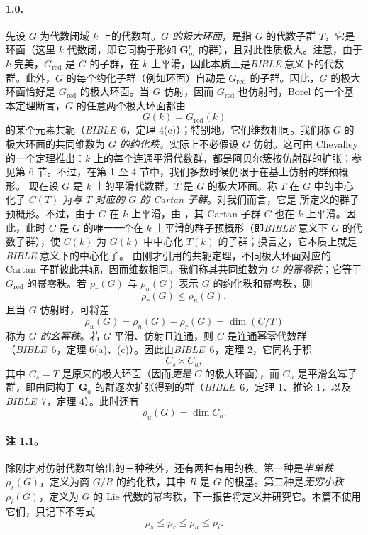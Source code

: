 \paragraph{\textbf{1.0.}}
先设 \(G\) 为代数闭域 \(k\) 上的代数群。\emph{\(G\) 的极大环面}，是指 \(G\) 的代数子群 \(T\)，它是环面（这里 \(k\) 代数闭，即它同构于形如 \(\mathbf G_m^r\) 的群），且对此性质极大。注意，由于 \(k\) 完美，\(G_{\mathrm{red}}\) 是 \(G\) 的子群，在 \(k\) 上平滑，因此本质上是\emph{BIBLE} 意义下的代数群。此外，\(G\) 的每个约化子群（例如环面）自动是 \(G_{\mathrm{red}}\) 的子群。因此，\(G\) 的极大环面恰好是 \(G_{\mathrm{red}}\) 的极大环面。当 \(G\) 仿射，因而 \(G_{\mathrm{red}}\) 也仿射时，Borel 的一个基本定理断言，\(G\) 的任意两个极大环面都由
\[
  G(k)=G_{\mathrm{red}}(k)
\]
的某个元素共轭（\emph{BIBLE}~6，定理 4(c)）；特别地，它们维数相同。我们称 \(G\) 的极大环面的共同维数为 \emph{\(G\) 的约化秩}。实际上不必假设 \(G\) 仿射。这可由 Chevalley 的一个定理推出：\(k\) 上的每个连通平滑代数群，都是阿贝尔簇按仿射群的扩张；参见第 6 节。不过，在第 1 至 4 节中，我们多数时候仍限于在基上仿射的群预概形。
现在设 \(G\) 是 \(k\) 上的平滑代数群，\(T\) 是 \(G\) 的极大环面。称 \(T\) 在 \(G\) 中的中心化子 \(C(T)\) 为\emph{与 \(T\) 对应的 \(G\) 的 Cartan 子群}。对我们而言，它是  所定义的群子预概形。不过，由于 \(G\) 在 \(k\) 上平滑，由 ，其 Cartan 子群 \(C\) 也在 \(k\) 上平滑。因此，此时 \(C\) 是 \(G\) 的唯一一个在 \(k\) 上平滑的群子预概形（即\emph{BIBLE} 意义下 \(G\) 的代数子群），使 \(C(k)\) 为 \(G(k)\) 中中心化 \(T(k)\) 的子群；换言之，它本质上就是\emph{BIBLE} 意义下的中心化子。
由刚才引用的共轭定理，不同极大环面对应的 Cartan 子群彼此共轭，因而维数相同。我们称其共同维数为 \emph{\(G\) 的幂零秩}；它等于 \(G_{\mathrm{red}}\) 的幂零秩。若 \(\rho_r(G)\) 与 \(\rho_n(G)\) 表示 \(G\) 的约化秩和幂零秩，则
\[
  \rho_r(G)\leq \rho_n(G),
\]
且当 \(G\) 仿射时，可将差
\[
  \rho_u(G)=\rho_n(G)-\rho_r(G)=\dim(C/T)
\]
称为 \emph{\(G\) 的幺幂秩}。若 \(G\) 平滑、仿射且连通，则 \(C\) 是连通幂零代数群（\emph{BIBLE}~6，定理 6(a)、(c)）。因此由\emph{BIBLE}~6，定理 2，它同构于积
\[
  C_s\times C_u,
\]
其中 \(C_s=T\) 是原来的极大环面（因而\emph{更是} \(C\) 的极大环面），而 \(C_u\) 是平滑幺幂子群，即由同构于 \(\mathbf G_a\) 的群逐次扩张得到的群（\emph{BIBLE}~6，定理 1、推论 1，以及\emph{BIBLE}~7，定理 4）。此时还有
\[
  \rho_u(G)=\dim C_u.
\]
\paragraph{\textbf{注 1.1。}}
除刚才对仿射代数群给出的三种秩外，还有两种有用的秩。第一种是\emph{半单秩} \(\rho_s(G)\)，定义为商 \(G/R\) 的约化秩，其中 \(R\) 是 \(G\) 的根基。第二种是\emph{无穷小秩} \(\rho_i(G)\)，定义为 \(G\) 的 Lie 代数的幂零秩，下一报告将定义并研究它。本篇不使用它们，只记下不等式
\[
  \rho_s\leq \rho_r\leq \rho_n\leq \rho_i.
\]
